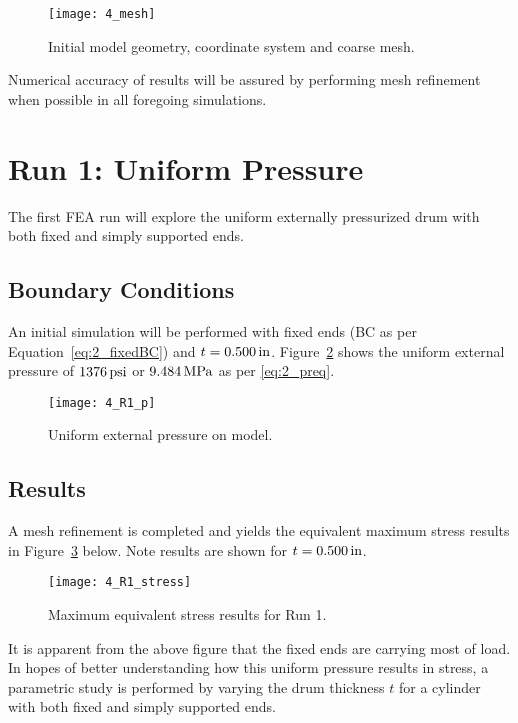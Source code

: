 \begin{figure}[H]
	\centering
	\texttt{[image: 4\_mesh]}
	\caption{Initial model geometry, coordinate system and coarse mesh.}
	\label{fig:4_mesh}
\end{figure}

Numerical accuracy of results will be assured by performing mesh refinement when possible in all foregoing simulations.

\section{Run 1: Uniform Pressure}
\label{section:4_R1}

The first FEA run will explore the uniform externally pressurized drum with both fixed and simply supported ends. 

\subsection{Boundary Conditions}
\label{subsection:R1BC}

An initial simulation will be performed with fixed ends (BC as per Equation~\ref{eq:2_fixedBC}) and $t=0.500\,\mathrm{in}$. Figure~\ref{fig:4_R1_p} shows the uniform external pressure of $1376 \,\mathrm{psi}$ or $9.484 \,\mathrm{MPa}$ as per \ref{eq:2_preq}.
\begin{figure}[H]
	\centering
	\texttt{[image: 4\_R1\_p]}
	\caption{Uniform external pressure on model.}
	\label{fig:4_R1_p}
\end{figure}

\subsection{Results}

A mesh refinement is completed and yields the equivalent maximum stress results in Figure~\ref{fig:4_R1_stress} below. Note results are shown for $t=0.500\,\mathrm{in}$.

\begin{figure}[H]
	\centering
	\texttt{[image: 4\_R1\_stress]}
	\caption{Maximum equivalent stress results for Run 1.}
	\label{fig:4_R1_stress}
\end{figure}

It is apparent from the above figure that the fixed ends are carrying most of load. In hopes of better understanding how this uniform pressure results in stress, a parametric study is performed by varying the drum thickness $t$ for a cylinder with both fixed and simply supported ends.

